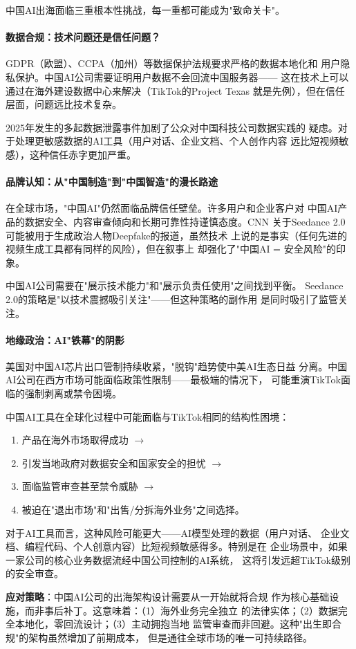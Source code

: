 中国AI出海面临三重根本性挑战，每一重都可能成为"致命关卡"。

\paragraph{数据合规：技术问题还是信任问题？}
GDPR（欧盟）、CCPA（加州）等数据保护法规要求严格的数据本地化和
用户隐私保护。中国AI公司需要证明用户数据不会回流中国服务器——
这在技术上可以通过在海外建设数据中心来解决（TikTok的Project Texas
就是先例），但在信任层面，问题远比技术复杂。

2025年发生的多起数据泄露事件加剧了公众对中国科技公司数据实践的
疑虑。对于处理更敏感数据的AI工具（用户对话、企业文档、个人创作内容
远比短视频敏感），这种信任赤字更加严重。

\paragraph{品牌认知：从"中国制造"到"中国智造"的漫长路途}
在全球市场，"中国AI"仍然面临品牌信任壁垒。许多用户和企业客户对
中国AI产品的数据安全、内容审查倾向和长期可靠性持谨慎态度。CNN
关于Seedance 2.0可能被用于生成政治人物Deepfake的报道，虽然技术
上说的是事实（任何先进的视频生成工具都有同样的风险），但在叙事上
却强化了"中国AI = 安全风险"的印象。

中国AI公司需要在"展示技术能力"和"展示负责任使用"之间找到平衡。
Seedance 2.0的策略是"以技术震撼吸引关注"——但这种策略的副作用
是同时吸引了监管关注。

\paragraph{地缘政治：AI"铁幕"的阴影}
美国对中国AI芯片出口管制持续收紧，"脱钩"趋势使中美AI生态日益
分离。中国AI公司在西方市场可能面临政策性限制——最极端的情况下，
可能重演TikTok面临的强制剥离或禁令困境。

\begin{warnbox}
中国AI工具在全球化过程中可能面临与TikTok相同的结构性困境：
\begin{enumerate}
  \item 产品在海外市场取得成功 $\to$
  \item 引发当地政府对数据安全和国家安全的担忧 $\to$
  \item 面临监管审查甚至禁令威胁 $\to$
  \item 被迫在"退出市场"和"出售/分拆海外业务"之间选择。
\end{enumerate}
对于AI工具而言，这种风险可能更大——AI模型处理的数据（用户对话、
企业文档、编程代码、个人创意内容）比短视频敏感得多。特别是在
企业场景中，如果一家公司的核心业务数据流经中国公司控制的AI系统，
这将引发远超TikTok级别的安全审查。

\medskip
\textbf{应对策略}：中国AI公司的出海架构设计需要从一开始就将合规
作为核心基础设施，而非事后补丁。这意味着：（1）海外业务完全独立
的法律实体；（2）数据完全本地化，零回流设计；（3）主动拥抱当地
监管审查而非回避。这种"出生即合规"的架构虽然增加了前期成本，
但是通往全球市场的唯一可持续路径。
\end{warnbox}



